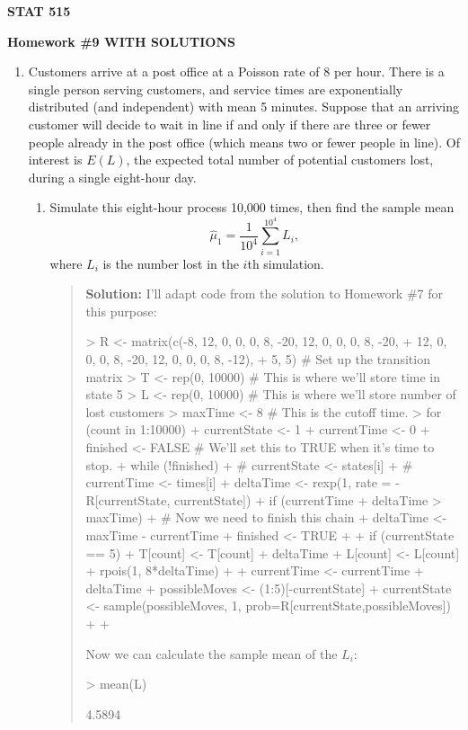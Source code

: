 \documentclass{article}
\begin{document}
\begin{center}
{\bf STAT 515}

{\bf Homework \#9 WITH SOLUTIONS}

\end{center}


\begin{enumerate}

  \item Customers arrive at a post office at a Poisson rate of 8 per hour. There
  is a single person serving customers, and service times are exponentially
  distributed (and independent) with mean 5 minutes. Suppose that an arriving
  customer will decide to wait in line if and only if there are three or fewer
  people already in the post office (which means two or fewer people in line).
  Of interest is $E(L)$, the expected total number of potential customers lost,
  during a single eight-hour day.
  
    \begin{enumerate}
    
    \item Simulate this eight-hour process 10,000 times, then find the sample
    mean
    \[
    \hat\mu_1 = \frac{1}{10^{4}} \sum_{i=1}^{10^4} L_i,
    \]
    where $L_i$ is the number lost in the $i$th simulation.
    \begin{quotation}{\bf Solution:}
    I'll adapt code from the solution to Homework \#7 for this purpose:
\begin{Schunk}
\begin{Sinput}
> R <- matrix(c(-8, 12, 0, 0, 0, 8, -20, 12, 0, 0, 0, 8, -20, 
+              12, 0, 0, 0, 8, -20, 12, 0, 0, 0, 8, -12),
+          5, 5)  # Set up the transition matrix
> T <- rep(0, 10000) # This is where we'll store time in state 5
> L <- rep(0, 10000) # This is where we'll store number of lost customers
> maxTime <- 8 # This is the cutoff time.
> for (count in 1:10000) {
+   currentState <- 1
+   currentTime <- 0
+   finished <- FALSE # We'll set this to TRUE when it's time to stop.
+   while (!finished) {
+ #    currentState <- states[i]
+ #    currentTime <- times[i]
+     deltaTime <- rexp(1, rate = -R[currentState, currentState])
+     if (currentTime + deltaTime > maxTime) {
+       # Now we need to finish this chain
+       deltaTime <- maxTime - currentTime
+       finished <- TRUE
+     }
+     if (currentState == 5) {
+       T[count] <- T[count] + deltaTime
+       L[count] <- L[count] + rpois(1, 8*deltaTime)
+     }
+     currentTime <- currentTime + deltaTime
+     possibleMoves <- (1:5)[-currentState]
+     currentState <- sample(possibleMoves, 1, prob=R[currentState,possibleMoves])
+   }
+ }
\end{Sinput}
\end{Schunk}
    Now we can calculate the sample mean of the $L_i$:
\begin{Schunk}
\begin{Sinput}
> mean(L)
\end{Sinput}
\begin{Soutput}
[1] 4.5894
\end{Soutput}
\end{Schunk}
    \end{quotation}


\end{enumerate}
\end{enumerate}
\end{document}
